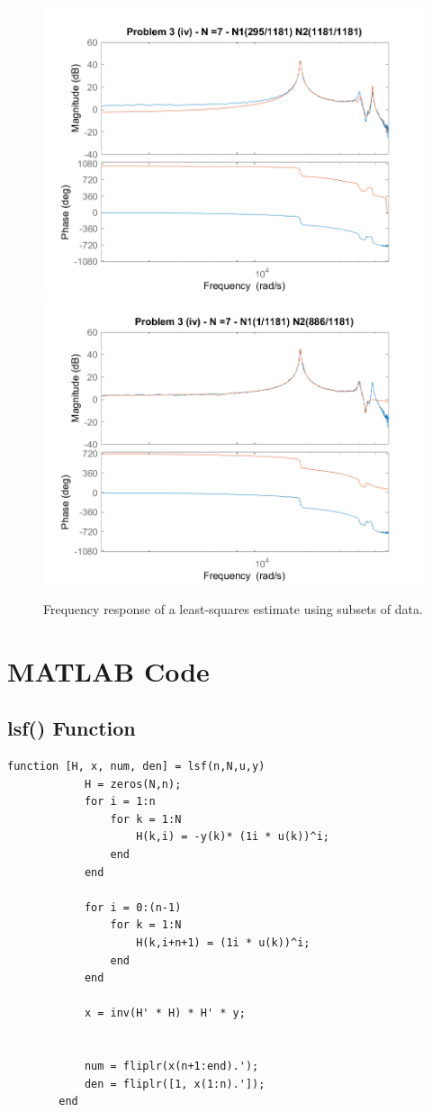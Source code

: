 \documentclass[]{article}
\begin{document}
		\begin{figure}[h]
			\centering
			\includegraphics[width=0.6\linewidth]{fig/MECH6325_CA1_pblm3_iv_n=7N1(4)N2(0)}
			\includegraphics[width=0.6\linewidth]{fig/MECH6325_CA1_pblm3_iv_n=7N1(0)N2(4)}
			\caption{Frequency response of a least-squares estimate using subsets of data.}
			\label{fig:pblm3_iv}
		\end{figure}
		
	
\newpage
\appendix
\section{MATLAB Code} \label{apx:MATLAB}

	\subsection{lsf() Function}
		\begin{Verbatim}[tabsize=4]
		function [H, x, num, den] = lsf(n,N,u,y)
			H = zeros(N,n);
			for i = 1:n
				for k = 1:N
					H(k,i) = -y(k)* (1i * u(k))^i;
				end
			end
			
			for i = 0:(n-1)
				for k = 1:N
					H(k,i+n+1) = (1i * u(k))^i;
				end
			end
			
			x = inv(H' * H) * H' * y;
			
			
			num = fliplr(x(n+1:end).');
			den = fliplr([1, x(1:n).']);
		end
		\end{Verbatim}
		
\end{document}

